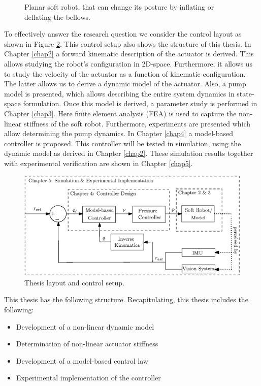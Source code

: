 \begin{figure}[H]
\begin{minipage}{.5\textwidth}
  \vspace{50pt}
  \caption{Planar soft robot, that can change its posture by inflating or deflating the bellows.}
  \label{fig:test2}
\end{minipage}
\end{figure}


To effectively answer the research question we consider the control layout as shown in Figure \ref{fig1:controlarchitecture}. This control setup also shows the structure of this thesis. In Chapter \ref{chap2} a forward kinematic description of the actuator is derived. This allows studying the robot's configuration in 2D-space. Furthermore, it allows us to study the velocity of the actuator as a function of kinematic configuration. The latter allows us to derive a dynamic model of the actuator. Also, a pump model is presented, which allows describing the entire system dynamics in state-space formulation. Once this model is derived, a parameter study is performed in Chapter \ref{chap3}. Here finite element analysis (FEA) is used to capture the non-linear stiffness of the soft robot. Furthermore, experiments are presented which allow determining the pump dynamics. In Chapter \ref{chap4} a model-based controller is proposed. This controller will be tested in simulation, using the dynamic model as derived in Chapter \ref{chap2}. These simulation results together with experimental verification are shown in Chapter \ref{chap5}.




\begin{figure}[H]
    \centering
    \includegraphics[width = \textwidth]{Figures/Chapter1/controlschemeCompleteGood.eps}
    \caption{Thesis layout and control setup.}
    \label{fig1:controlarchitecture}
\end{figure}





This thesis has the following structure.
Recapitulating, this thesis includes the following:


\begin{itemize}
    \item Development of a non-linear dynamic model
    \item Determination of non-linear actuator stiffness
    \item Development of a model-based control law
    \item Experimental implementation of the controller
\end{itemize}


